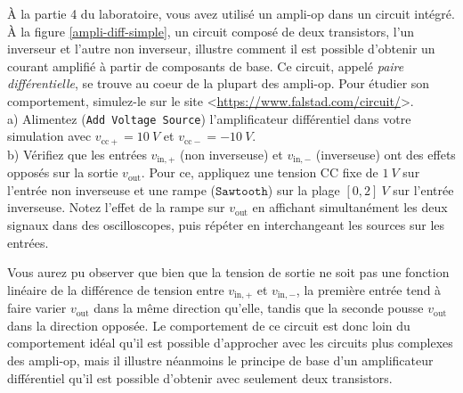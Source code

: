 \documentclass[canadien,12pt,oneside,letterpaper]{article}
\begin{document}
\begin{gradescope}
\item À la partie 4 du laboratoire, vous avez utilisé un ampli-op dans un circuit intégré. À la figure \ref{ampli-diff-simple}, un circuit composé de deux transistors, l’un inverseur et l’autre non inverseur, illustre comment il est possible d'obtenir un courant amplifié à partir de composants de base. Ce circuit, appelé \textit{paire différentielle}, se trouve au coeur de la plupart des ampli-op. Pour étudier son comportement, simulez-le sur le site <\url{https://www.falstad.com/circuit/}>.
\\a) Alimentez (\texttt{Add Voltage Source}) l'amplificateur différentiel dans votre simulation avec $v_{\mathrm{cc}+}=10~V$ et $v_{\mathrm{cc}-}=-10~V$.
\\b) Vérifiez que les entrées $v_{\mathrm{in},+}$ (non inverseuse) et $v_{\mathrm{in},-}$ (inverseuse) ont des effets opposés sur la sortie $v_{\mathrm{out}}$. Pour ce, appliquez une tension CC fixe de $1~V$ sur l'entrée non inverseuse et une rampe ($\texttt{Sawtooth}$) sur la plage $[0,2]~V$ sur l'entrée inverseuse. Notez l'effet de la rampe sur $v_{\mathrm{out}}$ en affichant simultanément les deux signaux dans des oscilloscopes, puis répéter en interchangeant les sources sur les entrées.

Vous aurez pu observer que bien que la tension de sortie ne soit pas une fonction linéaire de la différence de tension entre $v_{\mathrm{in},+}$ et $v_{\mathrm{in},-}$, la première entrée tend à faire varier $v_{\mathrm{out}}$ dans la même direction qu'elle, tandis que la seconde pousse $v_{\mathrm{out}}$ dans la direction opposée. Le comportement de ce circuit est donc loin du comportement idéal qu'il est possible d'approcher avec les circuits plus complexes des ampli-op, mais il illustre néanmoins le principe de base d'un amplificateur différentiel qu'il est possible d'obtenir avec seulement deux transistors.


\end{gradescope}
\end{document}
